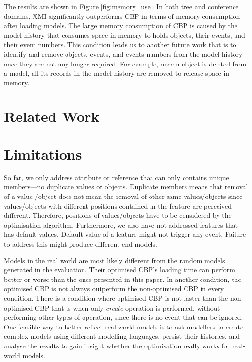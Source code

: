 \documentclass{llncs}
\begin{document}
The results are shown in Figure \ref{fig:memory_use}. In both tree and conference domains, XMI significantly outperforms CBP in terms of memory consumption after loading models. The large memory consumption of CBP is caused by the model history that consumes space in memory to holds objects, their events, and their event numbers. This condition leads us to another future work that is to identify and remove objects, events, and events numbers from the model history once they are not any longer required. For example, once a object is deleted from a model, all its records in the model history are removed to release space in memory. 

\section{Related Work}
\label{sec:related_work}
\lipsum[3]
\lipsum[4]

\section{Limitations}
\label{sec:limitations}
So far, we only address attribute or reference that can only contains unique members---no duplicate values or objects. Duplicate members means that removal of a value /object does not mean the removal of other same values/objects since values/objects with different positions contained in the feature are perceived different. Therefore, positions of values/objects have to be considered by the optimisation algorithm. Furthermore, we also have not addressed features that has default values. Default value of a feature might not trigger any event. Failure to address this might produce different end models. 

Models in the real world are most likely different from the random models generated in the evaluation. Their optimised CBP's loading time can perform better or worse than the ones presented in this paper. In another condition, the optimised CBP is not always outperform the non-optimised CBP in every condition. There is a condition where optimised CBP is not faster than the non-optimised CBP that is when only \emph{create} operation is performed, without performing other types of operation, since there is no event that can be ignored. One feasible way to better reflect real-world models is to ask modellers to create complex models using different modelling languages, persist their histories, and analyse the results to gain insight whether the optimisation really works for real-world models. 
\end{document}
